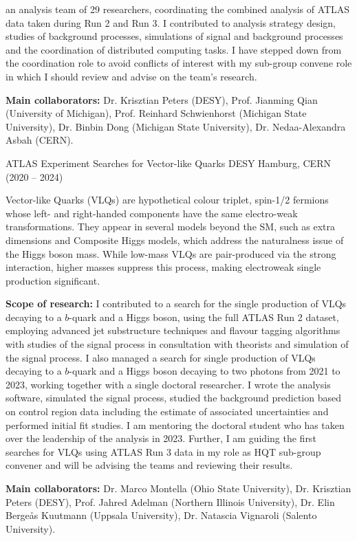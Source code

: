\begin{cventries}
{\begin{cvitems}
    an analysis team of 29 researchers, coordinating the combined analysis of ATLAS data taken
    during Run 2 and Run 3. I contributed to analysis strategy design, studies of background
    processes, simulations of signal and background processes and the coordination of distributed
    computing tasks. I have stepped down from the coordination role to avoid conflicts of interest
    with my sub-group convene role in which I should review and advise on the team's research.
    \item \textbf{Main collaborators:} Dr. Krisztian Peters (DESY), Prof. Jianming Qian (University of Michigan), Prof. Reinhard Schwienhorst (Michigan State University), Dr. Binbin Dong (Michigan State University), Dr. Nedaa-Alexandra Asbah (CERN).
  \end{cvitems}
}

\cventry
{ATLAS Experiment} %
{Searches for Vector-like Quarks} %
{DESY Hamburg, CERN} %
{(2020 – 2024)} %
{
  \begin{cvitems} %
    \item {Vector-like Quarks (VLQs) are hypothetical colour triplet, spin-1/2 fermions whose left- and right-handed components have the same electro-weak transformations. They appear in several models beyond the SM, such as extra dimensions and Composite Higgs models, which address the
    naturalness issue of the Higgs boson mass. While low-mass VLQs are pair-produced via the strong
    interaction, higher masses suppress this process, making electroweak single production significant.}
    \item \textbf{Scope of research:} I contributed to a search for the single production of VLQs decaying to a \(b\)-quark and a Higgs boson, using the full ATLAS Run 2 dataset, employing advanced jet
    substructure techniques and flavour tagging algorithms with studies of the signal process in
    consultation with theorists and simulation of the signal process. I also managed a search for
    single production of VLQs decaying to a \(b\)-quark and a Higgs boson decaying to two photons
    from 2021 to 2023, working together with a single doctoral researcher. I wrote the analysis
    software, simulated the signal process, studied the background prediction based on control
    region data including the estimate of associated uncertainties and performed initial fit studies. I am mentoring the doctoral student who has taken over the leadership of the analysis in 2023. Further, I am guiding the first searches for VLQs using ATLAS Run 3 data in my role as HQT sub-group convener and will be advising the teams and reviewing their results.
    \item \textbf{Main collaborators:} Dr. Marco Montella (Ohio State University), Dr. Krisztian Peters (DESY), Prof. Jahred Adelman (Northern Illinois University), Dr. Elin Bergeås Kuutmann (Uppsala University), Dr. Natascia Vignaroli (Salento University).
  \end{cvitems}
}



\end{cventries}
